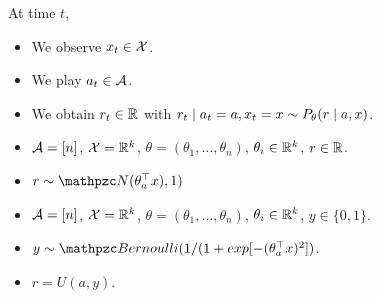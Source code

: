 \begin{frame}
  \begin{definition}
    At time $t$,
    \begin{itemize}
    \item We observe $x_t \in {\mathcal{X}}$.
    \item We play $a_t \in {\mathcal{A}}$.
    \item We obtain $r_t \in {\mathbb{R}}$ with
      $r_t \mid a_t = a, x_t = x \sim P_\theta(r \mid a, x)$.
    \end{itemize}
  \end{definition}

  \begin{example}
    \begin{itemize}
    \item ${\mathcal{A}} = [n]$, ${\mathcal{X}} = {\mathbb{R}}^k$,
      $\theta = (\theta_1, \ldots, \theta_n)$,
      $\theta_i \in {\mathbb{R}}^k$, $r \in {\mathbb{R}}$.
    \item $r \sim \Normal(\transpose{\param_a} x), 1)$
    \end{itemize}
  \end{example}

  \begin{example}
    \begin{itemize}
    \item ${\mathcal{A}} = [n]$, ${\mathcal{X}} = {\mathbb{R}}^k$,
      $\theta = (\theta_1, \ldots, \theta_n)$,
      $\theta_i \in {\mathbb{R}}^k$, $y \in \{0,1\}$.
    \item $y \sim \Bernoulli(1/(1 + exp[- (\transpose{\param_a} x)^2])$.
    \item $r = U(a,y)$.
    \end{itemize}
  \end{example}
\end{frame}

